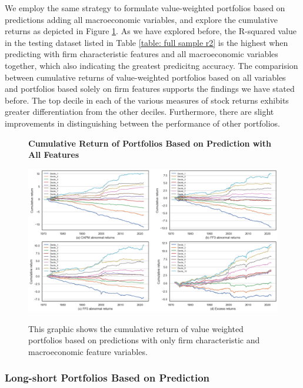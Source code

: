 We employ the same strategy to formulate value-weighted portfolios based on predictions adding all macroeconomic variables, and explore the cumulative returns as depicted in Figure \ref{fig: portfolios cum return all features}. As we have explored before, the R-squared value in the testing dataset listed in Table \ref{table: full sample r2} is the highest when predicting with firm characteristic features and all macroeconomic variables together, which also indicating the greatest predicitng accuracy. The comparision between cumulative returns of value-weighted portfolios based on all variables and portfolios based solely on firm features supports the findings we have stated before. The top decile in each of the various measures of stock returns exhibits greater differentiation from the other deciles. Furthermore, there are slight improvements in distinguishing between the performance of other portfolios.

\begin{figure}[H]
  \centering
  \caption{\textbf{Cumulative Return of Portfolios Based on Prediction with All Features}}
  \includegraphics[width=.8\textwidth]{images/vw_portfolios_cumulative_return_all.png}
  \label{fig: portfolios cum return all features}
  \caption*{\footnotesize{This graphic shows the cumulative return of value weighted portfolios based on predictions with only firm characteristic and macroeconomic feature variables.}}
\end{figure}

\subsubsection{Long-short Portfolios Based on Prediction}

